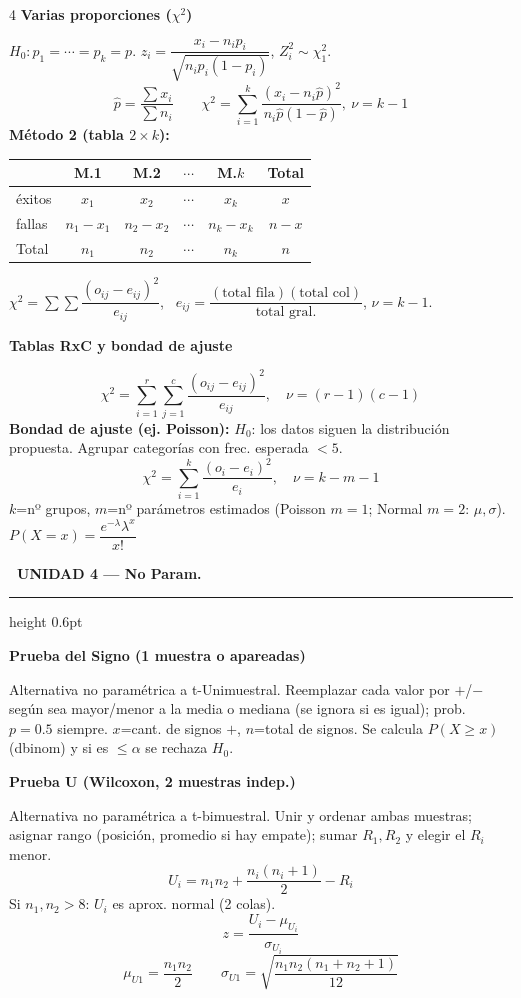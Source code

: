\documentclass[9pt,a4paper]{article}
\newcommand{\bodysize}{\fontsize{9.2}{10.8}\selectfont}
\newcommand{\notesize}{\fontsize{7.8}{9.1}\selectfont}
\newcommand{\subsize}{\fontsize{10.5}{12.3}\selectfont\bfseries}
\newcommand{\unitsize}{\fontsize{13.5}{15.5}\selectfont\bfseries}
\newcommand{\unithead}[2]{%
  \par\vspace{2.5pt}
  \noindent\colorbox{#1!22}{\textcolor{#1!65!black}{\unitsize\ #2}}%
  \par\vspace{1.5pt}\hrule height 0.6pt \color{#1!55!black}\vspace{2pt}\color{black}%
}
\newcommand{\topic}[2]{\subsize\textcolor{#1!60!black}{#2}\par\vspace{0.5pt}\bodysize}
\begin{document}
\begin{multicols}{4}
\topic{teal}{Varias proporciones ($\chi^2$)}
$H_0: p_1=\cdots=p_k=p$. $z_i=\dfrac{x_i-n_ip_i}{\sqrt{n_ip_i(1-p_i)}}$, $Z_i^2\sim\chi_1^2$.
\[
\hat{p}=\frac{\sum x_i}{\sum n_i} \qquad
\chi^2=\sum_{i=1}^{k}\frac{(x_i-n_i\hat{p})^2}{n_i\hat{p}(1-\hat{p})}, \ \nu=k-1
\]
\textbf{Método 2 (tabla $2\times k$):}
\begin{center}
{\notesize
\setlength{\tabcolsep}{2pt}
\begin{tabular}{@{}l c c c c c@{}}
\toprule
 & M.1 & M.2 & $\cdots$ & M.$k$ & Total \\
\midrule
éxitos & $x_1$ & $x_2$ & $\cdots$ & $x_k$ & $x$ \\
fallas & $n_1-x_1$ & $n_2-x_2$ & $\cdots$ & $n_k-x_k$ & $n-x$ \\
Total & $n_1$ & $n_2$ & $\cdots$ & $n_k$ & $n$ \\
\bottomrule
\end{tabular}
}
\end{center}
$\chi^2=\sum\sum\dfrac{(o_{ij}-e_{ij})^2}{e_{ij}}$, \ $e_{ij}=\dfrac{(\text{total fila})(\text{total col})}{\text{total gral.}}$, $\nu=k-1$.

\topic{teal}{Tablas RxC y bondad de ajuste}
\[
\chi^2=\sum_{i=1}^{r}\sum_{j=1}^{c}\frac{(o_{ij}-e_{ij})^2}{e_{ij}}, \quad \nu=(r-1)(c-1)
\]
\textbf{Bondad de ajuste (ej. Poisson):} $H_0$: los datos siguen la distribución propuesta. Agrupar categorías con frec. esperada $<5$.
\[
\chi^2=\sum_{i=1}^{k}\frac{(o_i-e_i)^2}{e_i}, \quad \nu=k-m-1
\]
$k$=nº grupos, $m$=nº parámetros estimados (Poisson $m=1$; Normal $m=2$: $\mu,\sigma$). $P(X=x)=\dfrac{e^{-\lambda}\lambda^x}{x!}$

\unithead{violet}{UNIDAD 4 --- No Param.}

\topic{violet}{Prueba del Signo (1 muestra o apareadas)}
Alternativa no paramétrica a t-Unimuestral. Reemplazar cada valor por $+$/$-$ según sea mayor/menor a la media o mediana (se ignora si es igual); prob. $p=0.5$ siempre. $x$=cant. de signos $+$, $n$=total de signos.
Se calcula $P(X\geq x)$ (dbinom) y si es $\leq \alpha$ se rechaza $H_0$.

\topic{violet}{Prueba U (Wilcoxon, 2 muestras indep.)}
Alternativa no paramétrica a t-bimuestral. Unir y ordenar ambas muestras; asignar rango (posición, promedio si hay empate); sumar $R_1, R_2$ y elegir el $R_i$ menor.
\[
U_i = n_1n_2+\frac{n_i(n_i+1)}{2}-R_i
\]
Si $n_1,n_2>8$: $U_i$ es aprox. normal (2 colas).
\[
z=\frac{U_i-\mu_{U_i}}{\sigma_{U_i}}
\]
\[
\mu_{U1}=\frac{n_1n_2}{2} \qquad
\sigma_{U1}=\sqrt{\frac{n_1n_2(n_1+n_2+1)}{12}}
\]


\end{multicols}
\end{document}
